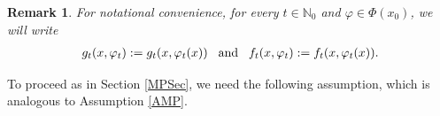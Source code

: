\documentclass[3p]{elsarticle}
\newcommand{\nat}{\mathbb N_0}
\newtheorem{remark}[thm]{Remark}
\begin{document}
	
	
	
	
	\begin{remark}
		For notational convenience, for every $t\in\nat$ and $\varphi\in\varPhi(x_0)$, we will write
		\begin{align}\label{notationalconvinience}
		g_t(x,\varphi_t):=g_t(x,\varphi_t(x))\hspace{0.3cm}\text{and}\hspace{0.3cm} f_t(x,\varphi_t):=f_t(x,\varphi_t(x)).
		\end{align}
	\end{remark}
	
	
	To proceed as in Section \ref{MPSec}, we need the following assumption, which is analogous to Assumption \ref{AMP}.
	
	
	
	
	
	
	
	
	
	
	
\end{document}
